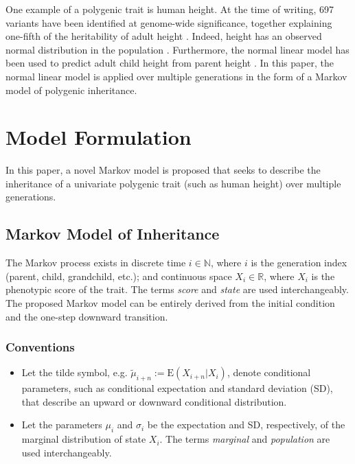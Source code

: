 \documentclass{svproc} %
\begin{document}
One example of a polygenic trait is human height. At the time of writing, 697 variants have been identified at genome-wide significance, together explaining one-fifth of the heritability of adult height \cite{preece, wood}. Indeed, height has an observed normal distribution in the population \cite{preece}. Furthermore, the normal linear model has been used to predict adult child height from parent height \cite{luo}. In this paper, the normal linear model is applied over multiple generations in the form of a Markov model of polygenic inheritance. 


\section{Model Formulation}

In this paper, a novel Markov model is proposed that seeks to describe the inheritance of a univariate polygenic trait (such as human height) over multiple generations. 


\subsection{Markov Model of Inheritance} \label{model_intro}

The Markov process exists in discrete time $ i \in \mathbb{N}$, where $i$ is the generation index (parent, child, grandchild, etc.); and continuous space $X_i \in \mathbb{R}$, where $X_i$ is the phenotypic score of the trait. The terms \emph{score} and \emph{state} are used interchangeably. The proposed Markov model can be entirely derived from the initial condition and the one-step downward transition. 


\subsubsection{Conventions} 

\begin{itemize}
\item Let the tilde symbol, e.g. $\tilde{\mu}_{i+n} := \mathrm{E}(X_{i+n}|X_i)$, denote conditional parameters, such as conditional expectation and standard deviation (SD), that describe an upward or downward conditional distribution. 
\item Let the parameters $\mu_i$ and $\sigma_i$ be the expectation and SD, respectively, of the marginal distribution of state $X_i$. The terms \emph{marginal} and \emph{population} are used interchangeably. 
\end{itemize}
\end{document}
